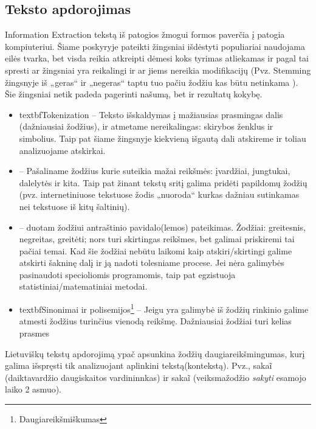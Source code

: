 \documentclass{VUMIFInfKursinis}
\begin{document}
	\subsection{Teksto apdorojimas}
	Information Extraction
		 tekstą iš patogios žmogui formos paverčia į patogia kompiuteriui. Šiame poskyryje pateikti žingsniai išdėstyti populiariai naudojama eilės tvarka, bet visda reikia atkreipti dėmesi koks tyrimas atliekamas ir pagal tai spresti ar žingsniai yra reikalingi ir ar jiems nereikia modifikacijų (Pvz. Stemming žingsnyje iš „geras“ ir „negeras“ taptu tuo pačiu žodžiu kas būtu netinkama ). Šie žingsniai netik padeda pagerinti našumą, bet ir rezultatų kokybę\cite{mugunthadevi2011survey}.
		\begin{itemize}
			\item textbf{Tokenization} – Teksto išskaldymas į mažiausias prasmingas dalis (dažniausiai žodžius), ir atmetame nereikalingas: skirybos ženklus ir simbolius. Taip pat šiame žingsnyje kiekvieną išgautą dali atskireme ir toliau analizuojame atskirkai.
			\item {} – Pašaliname žodžius kurie suteikia mažai reikšmės: įvardžiai, jungtukai, dalelytės ir kita. Taip pat žinant tekstų sritį galima pridėti papildomų žodžių (pvz. internetiniuose tekstuose žodis „nuoroda“ kurkas dažniau sutinkamas nei tekstuose iš kitų šaltinių).
			\item {} – duotam žodžiui antraštinio pavidalo(lemos) pateikimas.  Žodžiai: greitesnis, negreitas, greitėti; nors turi skirtingas reikšmes, bet galimai priskiremi tai pačiai temai. Kad šie žodžiai nebūtu laikomi kaip atskiri/skirtingi galime atskirti šakninę dalį ir ją nadoti tolesniame procese. Jei nėra galimybės pasinaudoti specioliomis programomis, taip pat egzistuoja statistiniai/matematiniai metodai. 
			\item textbf{Sinonimai ir polisemijos\footnote{Daugiareikšmiškumas}} – Jeigu yra galimybė iš žodžių rinkinio galime atmesti žodžius turinčius vienodą reikšmę. Dažniausiai žodžiai turi kelias prasmes 
		\end{itemize}
		Lietuviškų tekstų apdorojimą ypač apsunkina žodžių daugiareikšmingumas, kurį galima išspręsti tik analizuojant aplinkini tekstą(kontekstą). Pvz., saka\~{i} (daiktavardžio daugiskaitos vardininnkas) ir saka\~{i} (veiksmažodžio \textit{sakyti} esamojo laiko 2 asmuo).
		
\end{document}
